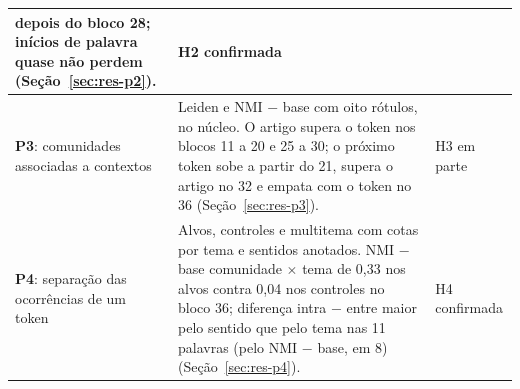 \begin{longtable}{@{}>{\raggedright\arraybackslash}p{3.5cm}
    >{\raggedright\arraybackslash}p{10.7cm} >{\raggedright\arraybackslash}p{1.9cm}@{}}
depois do bloco 28; inícios de palavra quase não perdem (Seção~\ref{sec:res-p2}). & H2 confirmada \\
\midrule
\textbf{P3}: comunidades associadas a contextos &
Leiden e NMI $-$ base com oito rótulos, no núcleo. O artigo supera o token nos blocos 11 a 20 e
25 a 30; o próximo token sobe a partir do 21, supera o artigo no 32 e empata com o token no 36
(Seção~\ref{sec:res-p3}). & H3 em parte \\
\midrule
\textbf{P4}: separação das ocorrências de um token &
Alvos, controles e multitema com cotas por tema e sentidos anotados. NMI $-$ base comunidade
$\times$ tema de 0,33 nos alvos contra 0,04 nos controles no bloco 36; diferença intra $-$ entre
maior pelo sentido que pelo tema nas 11 palavras (pelo NMI $-$ base, em 8)
(Seção~\ref{sec:res-p4}). & H4 confirmada \\
\bottomrule
\end{longtable}
\endgroup
